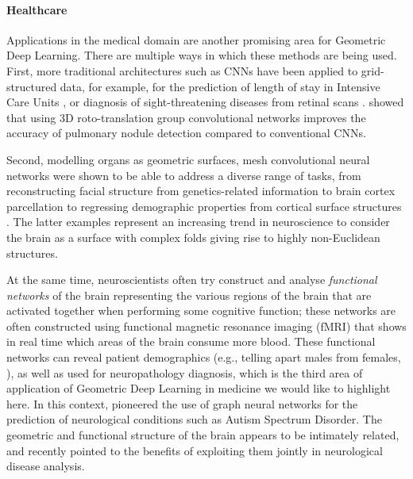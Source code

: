 \paragraph{Healthcare} 
%
Applications in the medical domain are another promising area for Geometric Deep Learning. There are multiple ways in which these methods are being used. 
%
First, more traditional architectures such as CNNs have been applied to grid-structured data, for example, for the 
prediction of length of stay in Intensive Care Units
\citep{rocheteau2020temporal}, 
or diagnosis of sight-threatening diseases from retinal scans \citep{de2018clinically}. 
%
\cite{winkels2019pulmonary} showed that using 3D roto-translation group convolutional networks improves 
the accuracy of pulmonary nodule detection compared to conventional CNNs.  


Second, modelling organs as geometric surfaces, mesh convolutional neural networks were shown to be able to address a diverse range of tasks, from reconstructing facial structure from genetics-related information \citep{mahdi20203d} to 
brain cortex parcellation \citep{cucurull2018convolutional} to 
regressing demographic properties from cortical surface structures \citep{besson2020geometric}. 
%
%
The latter examples represent an increasing trend in  neuroscience to consider the brain as a surface with complex folds giving rise to highly non-Euclidean structures. 


At the same time, 
neuroscientists often try construct and analyse {\em functional networks} of the brain representing the various regions of the brain that are activated together when performing some cognitive function; these networks are often constructed using functional magnetic resonance imaging (fMRI) that shows in real time which areas of the brain consume more blood. 
%
These functional networks can reveal patient demographics (e.g., telling apart males from females, \cite{arslan2018graph}), as well as used for neuropathology diagnosis, which is the third area of application of Geometric Deep Learning in medicine we would like to highlight here. In this context, \cite{ktena2017distance} pioneered the use of graph neural networks for the prediction of neurological conditions such as Autism Spectrum Disorder. 
%
The geometric and functional structure of the brain appears to be intimately related, and recently \cite{itani2021combining} pointed to the benefits of exploiting them jointly in neurological disease analysis.  


